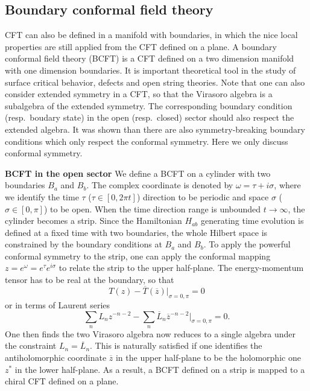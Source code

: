 \documentclass[submission, PhysLectNotes]{SciPost}
\begin{document}
\subsection{Boundary conformal field theory}
CFT can also be defined in a manifold with boundaries, in which the nice local properties are still applied from the CFT defined on a plane. A boundary conformal field theory (BCFT) is a CFT defined on a two dimension manifold with one dimension boundaries. It is important theoretical tool in the study of surface critical behavior, defects and open string theories. Note that one can also consider extended symmetry in a CFT, so that the Virasoro algebra is a subalgebra of the extended symmetry. The corresponding boundary condition (resp.\ boudary state) in the open (resp.\ closed) sector should also respect the extended algebra. It was shown than there are also symmetry-breaking boundary conditions which only respect the conformal symmetry. Here we only discuss conformal symmetry. 

{\bf BCFT in the open sector}
We define a BCFT on a cylinder with two boundaries $B_a$ and $B_b$. The complex coordinate is denoted by $\omega = \tau + i \sigma$, where we identify the time $\tau$ ($\tau \in [0,2\pi t]$) direction to be periodic and space $\sigma$ ($\sigma \in [0,\pi]$) to be open. When the time direction range is unbounded $t\rightarrow\infty$, the cylinder becomes a strip. Since the Hamiltonian $H_{ab}$ generating time evolution is defined at a fixed time with two boundaries, the whole Hilbert space is constrained by the boundary conditions at $B_a$ and $B_b$. To apply the powerful conformal symmetry to the strip, one can apply the conformal mapping $z = e^\omega = e^\tau e^{i\sigma}$ to relate the strip to the upper half-plane. The energy-momentum tensor has to be real at the boundary, so that
\begin{equation} \label{Eq_T_open}
    T(z) - \overline{T}(\overline{z})\vert_{\sigma=0,\pi} = 0
\end{equation}
or in terms of Laurent series 
\begin{equation}
    \sum_n L_n z^{-n-2} - \sum_n \overline{L}_n \overline{z}^{-n-2}\vert_{\sigma=0,\pi} = 0. 
\end{equation}
One then finds the two Virasoro algebra now reduces to a single algebra under the constraint $L_n = \overline{L}_n$. This is naturally satisfied if one identifies the antiholomorphic coordinate $\overline{z}$ in the upper half-plane to be the holomorphic one $z^*$ in the lower half-plane. As a result, a BCFT defined on a strip is mapped to a chiral CFT defined on a plane. 
\end{document}
